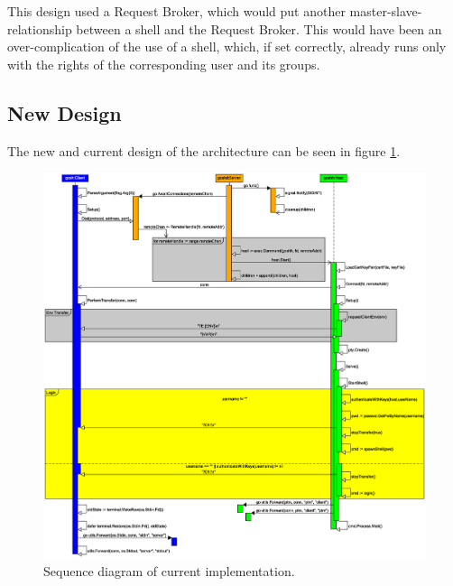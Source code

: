 \documentclass[10pt,a4paper,titlepage,twoside,english,final]{zhawreprt}
\begin{document}
This design used a \gls{Request Broker}, which would put another master-slave-relationship between a \gls{shell} and the \gls{Request Broker}. This would have been an over-complication of the use of a \gls{shell}, which, if set correctly, already runs only with the rights of the corresponding user and its groups.

\subsection{New Design}\label{ssec:NewDesign}
The new and current design of the architecture can be seen in figure \ref{fig:SeqDiaCurrent}.
\begin{figure}[ht]
\includegraphics[width=\textwidth]{SequenceDiagramNew}
\caption{Sequence diagram of current implementation.}
\label{fig:SeqDiaCurrent}
\end{figure}
\end{document}
